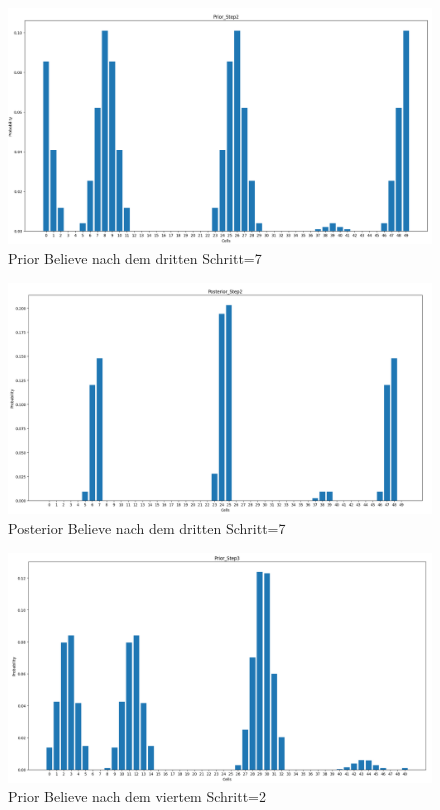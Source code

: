 \documentclass[12pt]{article}
\begin{document}
\begin{figure}[h]
    \centering
    \includegraphics[width=1.3\textwidth]{img/prior_step_2.png}
    \caption{Prior Believe nach dem dritten Schritt=7}
    \label{fig:Initiale Position}
\end{figure}

\begin{figure}[h]
    \centering
    \includegraphics[width=1.3\textwidth]{img/posterior_step_2.png}
    \caption{Posterior Believe nach dem dritten Schritt=7}
    \label{fig:Posterior Believe nach dem dritten Schritt=7}
\end{figure}

\begin{figure}[h]
    \centering
    \includegraphics[width=1.3\textwidth]{img/prior_step_3.png}
    \caption{Prior Believe nach dem viertem Schritt=2}
    \label{fig:Prior Believe nach dem viertem Schritt=2}
\end{figure}
\end{document}
